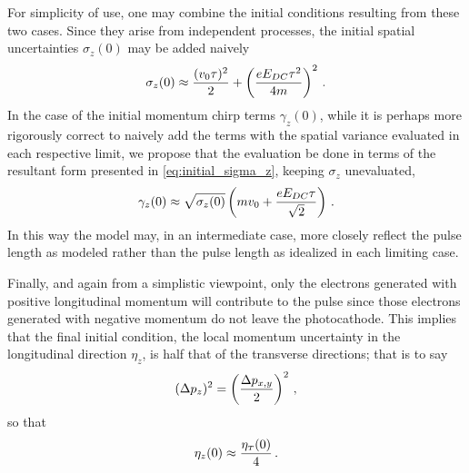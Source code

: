 For simplicity of use, one may combine the initial conditions resulting from these two cases.
Since they arise from independent processes, the initial spatial uncertainties $\sigma_{ z } ( 0 )$ may be added naively 
\begin{equation} \label{eq:initial_sigma_z}
  \sigma_{ z } ( 0 ) \approx \frac{ ( v_{ 0 } \tau )^{ 2 } }{ 2 } + \left ( \frac{ e E_{ DC } \tau^{ 2 } }{ 4 m } \right )^{ 2 } \, \text{.}
\end{equation}
In the case of the initial momentum chirp terms $\gamma_{ z } ( 0 )$, while it is perhaps more rigorously correct to naively add  the terms with the spatial variance evaluated in each respective limit, we propose that the evaluation be done in terms of the resultant form presented in \ref{eq:initial_sigma_z}, keeping $\sigma_{z}$ unevaluated, 
\begin{equation}
  \gamma_{ z } ( 0 ) \approx \sqrt{ \sigma_{ z } ( 0 ) } \left ( m v_{ 0 } + \frac{ e E_{DC} \tau }{ \sqrt{ 2 } } \right ) \, \text{.}
\end{equation}
In this way the model may, in an intermediate case, more closely reflect the pulse length as modeled rather than the pulse length as idealized in each limiting case.

Finally, and again from a simplistic viewpoint, only the electrons generated with positive longitudinal momentum will contribute to the pulse since those electrons generated with negative momentum do not leave the photocathode.
This implies that the final initial condition, the local momentum uncertainty in the longitudinal direction $\eta_z$, is half that of the transverse directions; that is to say
\begin{equation}
  ( \Delta p_{ z } )^{2} = \left ( \frac{\Delta p_{ x , y }}{ 2 } \right )^{2} \, \text{,}
\end{equation}
so that
\begin{equation}
  \eta_{ z } ( 0 ) \approx \frac{ \eta_{ {\scriptscriptstyle T} } ( 0 )}{ 4 } \, \text{.}
\end{equation}

